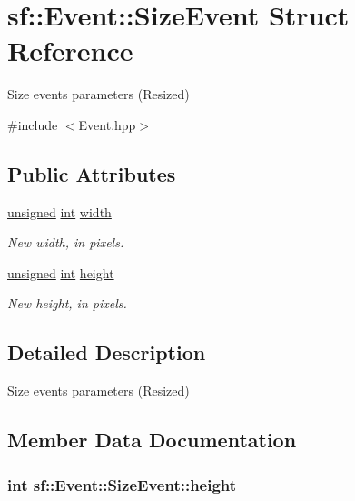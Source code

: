 \hypertarget{structsf_1_1_event_1_1_size_event}{\section{sf\-:\-:Event\-:\-:Size\-Event Struct Reference}
\label{structsf_1_1_event_1_1_size_event}
}


Size events parameters (Resized)  




{\ttfamily \#include $<$Event.\-hpp$>$}

\subsection*{Public Attributes}
\begin{DoxyCompactItemize}
\item 
\hyperlink{curses_8priv_8h_aca40206900cfc164654362fa8d4ad1e6}{unsigned} \hyperlink{term__entry_8h_ad65b480f8c8270356b45a9890f6499ae}{int} \hyperlink{structsf_1_1_event_1_1_size_event_a20ea1b78c9bb1604432f8f0067bbfd94}{width}
\begin{DoxyCompactList}\small\item\em New width, in pixels. \end{DoxyCompactList}\item 
\hyperlink{curses_8priv_8h_aca40206900cfc164654362fa8d4ad1e6}{unsigned} \hyperlink{term__entry_8h_ad65b480f8c8270356b45a9890f6499ae}{int} \hyperlink{structsf_1_1_event_1_1_size_event_af0f76a599d5f48189cb8d78d4e5facdb}{height}
\begin{DoxyCompactList}\small\item\em New height, in pixels. \end{DoxyCompactList}\end{DoxyCompactItemize}


\subsection{Detailed Description}
Size events parameters (Resized) 

\subsection{Member Data Documentation}
\hypertarget{structsf_1_1_event_1_1_size_event_af0f76a599d5f48189cb8d78d4e5facdb}{
\subsubsection[{height}]{ {\bf int} sf\-::\-Event\-::\-Size\-Event\-::height}}\label{structsf_1_1_event_1_1_size_event_af0f76a599d5f48189cb8d78d4e5facdb}


